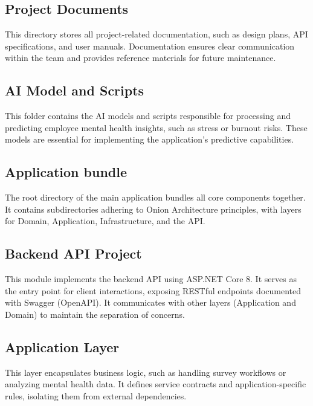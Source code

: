 \documentclass[conference]{IEEEtran}
\begin{document}
        \subsection{Project Documents}
            This directory stores all project-related documentation, such as design plans, API specifications, and user manuals. Documentation ensures clear communication within the team and provides reference materials for future maintenance.
        
        \subsection{AI Model and Scripts}
            
            This folder contains the AI models and scripts responsible for processing and predicting employee mental health insights, such as stress or burnout risks. These models are essential for implementing the application's predictive capabilities.
            
        \subsection{Application bundle}
        
            The root directory of the main application bundles all core components together. It contains subdirectories adhering to Onion Architecture principles, with layers for Domain, Application, Infrastructure, and the API.
        \subsection{Backend API Project}

            This module implements the backend API using ASP.NET Core 8. It serves as the entry point for client interactions, exposing RESTful endpoints documented with Swagger (OpenAPI). It communicates with other layers (Application and Domain) to maintain the separation of concerns.
            
        \subsection{Application Layer}
        
            This layer encapsulates business logic, such as handling survey workflows or analyzing mental health data. It defines service contracts and application-specific rules, isolating them from external dependencies.
            
\end{document}
